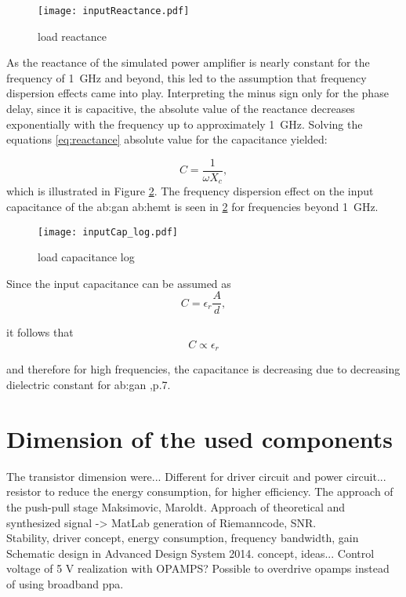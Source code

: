 \begin{figure}[ht]
	\centering
  \texttt{[image: inputReactance.pdf]}
	\caption{load reactance}
	\label{fig:inputReactance}
\end{figure}

As the reactance of the simulated power amplifier is nearly constant for the frequency of \SI{1}{\giga \hertz} and beyond, this led to the assumption that frequency dispersion effects came into play.
Interpreting the minus sign only for the phase delay, since it is capacitive, the absolute value of the reactance decreases exponentially with the frequency up to approximately \SI{1}{\giga \hertz}.
Solving the equations \ref{eq:reactance} absolute value for the capacitance yielded:

\begin{equation}
	C = \frac{1}{\omega X_c},
\end{equation}
which is illustrated in Figure \ref{fig:inputCap_log}.
The frequency dispersion effect on the input capacitance of the \gls{ab:gan} \gls{ab:hemt} is seen in \ref{fig:inputCap_log} for frequencies beyond \SI{1}{\giga \hertz}.

\begin{figure}[ht]
	\centering
  \texttt{[image: inputCap\_log.pdf]}
	\caption{load capacitance log}
	\label{fig:inputCap_log}
\end{figure}

Since the input capacitance can be assumed as 
\begin{equation}
	C = \epsilon_r \frac{A}{d},
\end{equation}

it follows that
\begin{equation}
	C \propto \epsilon_r 
\end{equation}

and therefore for high frequencies, the capacitance is decreasing due to decreasing dielectric constant for \gls{ab:gan} \cite{GaNBook},p.7. %


\section{Dimension of the used components}
The transistor dimension were... Different for driver circuit and power circuit... resistor to reduce the energy  consumption, for higher efficiency.
The approach of the push-pull stage Maksimovic, Maroldt.
Approach of theoretical and synthesized signal -> MatLab generation of Riemanncode, SNR.\\ Stability, driver concept, energy consumption, frequency bandwidth, gain
Schematic design in Advanced Design System 2014. concept, ideas... 
Control voltage of 5 V realization with OPAMPS? Possible to overdrive opamps instead of using broadband ppa. 

